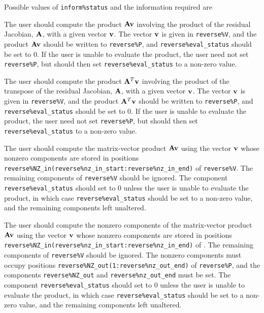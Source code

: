 \documentclass{galahad}
\begin{document}
Possible values of {\tt inform\%status} and the information required are
\begin{description}

 The user should compute the product ${\mathbf{A}} {\mathbf{v}}$
     involving the product of the residual Jacobian, ${\mathbf{A}}$,
     with a given vector ${\mathbf{v}}$.
     The vector ${\mathbf{v}}$ is given in {\tt reverse\%V}, and the
     product ${\mathbf{A}} {\mathbf{v}}$ should be written to {\tt reverse\%P},
     and  {\tt reverse\%eval\_status} should be set to 0.
     If the user is unable to evaluate the product,
     the user need not set {\tt reverse\%P}, but
     should then set {\tt reverse\%eval\_status} to a non-zero value.

 The user should compute the product ${\mathbf{A}}^T {\mathbf{v}}$
     involving the product of the transpose of the residual
     Jacobian, ${\mathbf{A}}$,  with a given vector ${\mathbf{v}}$.
     The vector ${\mathbf{v}}$ is given in {\tt reverse\%V}, and the
     product ${\mathbf{A}}^T {\mathbf{v}}$ should be written to {\tt reverse\%P},
     and  {\tt reverse\%eval\_status} should be set to 0.
     If the user is unable to evaluate the product,
     the user need not set {\tt reverse\%P}, but
     should then set {\tt reverse\%eval\_status} to a non-zero value.

 The user should compute the matrix-vector product ${\mathbf{A}} {\mathbf{v}}$
     using the vector ${\mathbf{v}}$ whose nonzero components are stored in positions
     {\tt reverse\%NZ\_in(reverse\%nz\_in\_start:reverse\%nz\_in\_end)}
     of {\tt reverse\%V}. The remaining components of
     {\tt reverse\%V} should be ignored.
     The component {\tt reverse\%eval\_status} should set to 0 unless the
     user is unable to evaluate the product, in which case
     {\tt reverse\%eval\_status} should be set to a non-zero value, and the
     remaining components left unaltered.

 The user should compute the nonzero components of the
     matrix-vector product ${\mathbf{A}} {\mathbf{v}}$ using the vector ${\mathbf{v}}$ whose
     nonzero components are stored in positions
     {\tt reverse\%NZ\_in(reverse\%nz\_in\_start:reverse\%nz\_in\_end)}
     of . The remaining components of
     {\tt reverse\%V} should be ignored. The nonzero components must
     occupy positions
     {\tt reverse\%NZ\_out(1:reverse\%nz\_out\_end)} of {\tt reverse\%P},
     and the components
     {\tt reverse\%NZ\_out} and {\tt reverse\%nz\_out\_end} must be set.
     The component {\tt reverse\%eval\_status} should set to 0 unless the
     user is unable to evaluate the product, in which case
     {\tt reverse\%eval\_status} should be set to a non-zero value, and the
      remaining components left unaltered.


\end{description}
\end{document}
